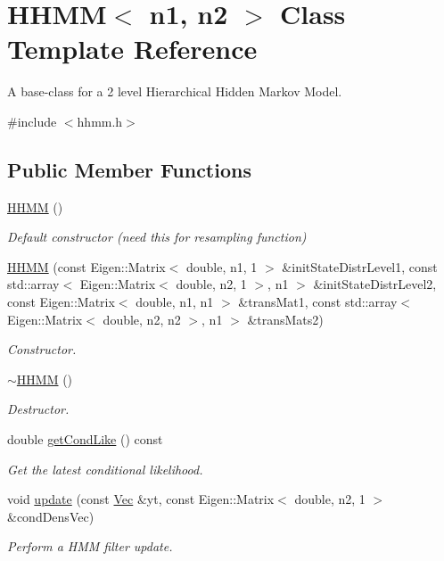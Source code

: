 \hypertarget{classHHMM}{}\section{H\+H\+MM$<$ n1, n2 $>$ Class Template Reference}
\label{classHHMM}


A base-\/class for a 2 level Hierarchical Hidden Markov Model.  




{\ttfamily \#include $<$hhmm.\+h$>$}

\subsection*{Public Member Functions}
\begin{DoxyCompactItemize}
\item 
\hyperlink{classHHMM_a311532121776ef969a5ac11b2c1064c7}{H\+H\+MM} ()
\begin{DoxyCompactList}\small\item\em Default constructor (need this for resampling function) \end{DoxyCompactList}\item 
\hyperlink{classHHMM_aa83ea5e23b2d0639b0426442b0231814}{H\+H\+MM} (const Eigen\+::\+Matrix$<$ double, n1, 1 $>$ \&init\+State\+Distr\+Level1, const std\+::array$<$ Eigen\+::\+Matrix$<$ double, n2, 1 $>$, n1 $>$ \&init\+State\+Distr\+Level2, const Eigen\+::\+Matrix$<$ double, n1, n1 $>$ \&trans\+Mat1, const std\+::array$<$ Eigen\+::\+Matrix$<$ double, n2, n2 $>$, n1 $>$ \&trans\+Mats2)
\begin{DoxyCompactList}\small\item\em Constructor. \end{DoxyCompactList}\item 
\hyperlink{classHHMM_a96429285ce9c928cc1c3018aa6572ae4}{$\sim$\+H\+H\+MM} ()
\begin{DoxyCompactList}\small\item\em Destructor. \end{DoxyCompactList}\item 
double \hyperlink{classHHMM_a70295abc7a933d593badaf50912f84e3}{get\+Cond\+Like} () const 
\begin{DoxyCompactList}\small\item\em Get the latest conditional likelihood. \end{DoxyCompactList}\item 
void \hyperlink{classHHMM_a28931d06c5885e3b9b1cbe2aeb345417}{update} (const \hyperlink{apf__filter_8h_a4c7df05c6f5e8a0d15ae14bcdbc07152}{Vec} \&yt, const Eigen\+::\+Matrix$<$ double, n2, 1 $>$ \&cond\+Dens\+Vec)
\begin{DoxyCompactList}\small\item\em Perform a H\+MM filter update. \end{DoxyCompactList}\end{DoxyCompactItemize}



